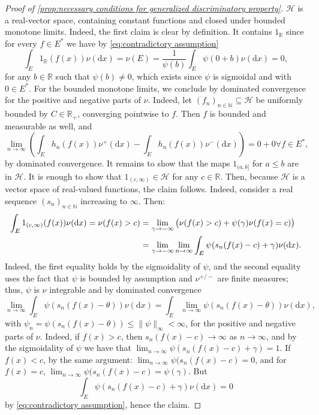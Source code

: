 \documentclass[11pt,a4paper,twoside,openany]{report}
\numberwithin{equation}{section}
\newcommand{\diff}{\mathrm{d}}
\theoremstyle{plain} %
\theoremstyle{definition} %
\theoremstyle{remark} %
\begin{document}
\begin{proof}[Proof of \ref{prop:necessary conditions for generalized discriminatory property}]
    
    \(\mathcal{H}\) is a real-vector space, containing constant functions and closed under  bounded monotone limits. Indeed, the first claim is clear by definition. It contains \(1_{\mathbb{R}}\) since for every \(f\in E^*\) we have by \eqref{eq:contradictory assumption}
    \begin{equation*}
        \int_E1_{\mathbb{R}}(f(x))\nu(\diff x)=\nu(E)=\frac{1}{\psi(b)}\int_E\psi(0+b)\nu(\diff x)=0,
    \end{equation*}
    for any \(b\in\mathbb{R}\) such that \(\psi(b)\neq 0\), which exists since \(\psi\) is sigmoidal and with \(0\in E^*\).
    For the bounded monotone limits, we conclude by dominated convergence for the positive and negative parts of \(\nu\). Indeed, let \((f_n)_{n\in\mathbb{N}}\subseteq \mathcal{H}\) be uniformly bounded by \(C\in\mathbb{R}_+\), converging pointwise to \(f\). Then \(f\) is bounded and measurable as well, and 
    \begin{equation*}
        \lim_{n\to\infty}(\int_Eh_n(f(x))\nu^+(\diff x)-\int_Eh_n(f(x))\nu^-(\diff x))=0+0\forall f\in E^*,
    \end{equation*}
    by dominated convergence. It remains to show that the maps \(1_{(a,b]}\) for \(a\leq b\) are in \(\mathcal{H}\). It is enough to show that \(1_{(c,\infty)}\in\mathcal{H}\) for any \(c\in\mathbb{R}\). Then, because \(\mathcal{H}\) is a vector space of real-valued functions, the claim follows. Indeed, consider a real sequence \((s_n)_{n\in\mathbb{N}}\) increasing to \(\infty\). Then:
    \begin{align*}
\int_E 1_{(c,\infty)}(f(x))\nu(\diff x)=\nu(f(x)>c)
&=\lim_{\gamma\to-\infty}\big(\nu(f(x)>c)+\psi(\gamma)\nu(f(x)=c)\big)\notag\\
&=\lim_{\gamma\to-\infty}\lim_{n\to\infty}\int_E\psi(s_n(f(x)-c)+\gamma)\nu(\diff x).
\end{align*}
    Indeed, the first equality holds by the sigmoidality of \(\psi\), and the second equality uses the fact that \(\psi\) is bounded by assumption and \(\nu^{+/-}\) are finite measures; thus, \(\psi\) is \(\nu\) integrable and by dominated convergence 
    \begin{equation*}
        \lim_{n\to\infty}\int_E\psi(s_n(f(x)-\theta))\nu(\diff x)=\int_E\lim_{n\to\infty}\psi(s_n(f(x)-\theta))\nu(\diff x),
        \end{equation*}
        with \(\psi_n=\psi(s_n(f(x)-\theta))\leq\lVert \psi\rVert_{\infty}<\infty\),  for the positive and negative parts of \(\nu\). Indeed, if \(f(x)>c\), then \(s_n(f(x)-c)\to\infty\) as \(n\to\infty\), and by the sigmoidality of \(\psi\) we have that \(\lim_{n\to\infty}\psi(s_n(f(x)-c)+\gamma)=1\). If \(f(x)<c\), by the same argument: \(\lim_{n\to\infty}\psi(s_n(f(x)-c)=0\), and for \(f(x)=c\), \(\lim_{n\to\infty}\psi(s_n(f(x)-c)=\psi(\gamma)\). But
        \begin{equation*}
            \int_E\psi(s_n(f(x)-c)+\gamma)\nu(\diff x)=0
        \end{equation*}
        by \eqref{eq:contradictory assumption}, hence the claim.
\end{proof}
\end{document}
